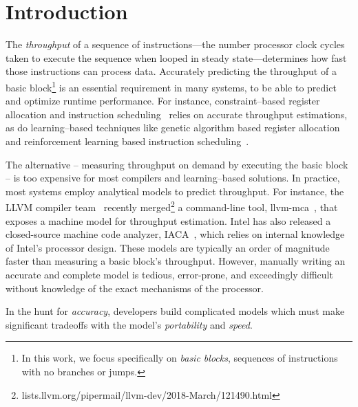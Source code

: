 \section{Introduction}

The {\em throughput} of a sequence of instructions---the number processor clock cycles taken to execute the sequence when looped in steady state---determines how fast those instructions can process data.
Accurately predicting the throughput of a basic block\footnote{In this work, we focus specifically on \emph{basic blocks}, sequences of instructions with no branches or jumps.} is an essential requirement in many systems, to be able to predict and optimize runtime performance.
For instance, constraint--based register allocation and instruction scheduling~\cite{comb-inst-scheduling} relies on accurate throughput estimations, as do learning--based techniques like genetic algorithm based register allocation~\cite{ga-register-allocation} and reinforcement learning based instruction scheduling~\cite{rl-inst-scheduling}.

The alternative -- measuring throughput on demand by executing the basic block -- is too expensive for most compilers and learning--based solutions.
In practice, most systems employ analytical models to predict throughput.
For instance, the LLVM compiler team~\cite{llvm} recently merged\footnote{ lists.llvm.org/pipermail/llvm-dev/2018-March/121490.html} a command-line tool, llvm-mca~\cite{llvm-mca}, that exposes a machine model for throughput estimation.
Intel has also released a closed-source machine code analyzer, IACA~\cite{iaca}, which relies on internal knowledge of Intel's processor design.
These models are typically an order of magnitude faster than measuring a basic block's throughput.
However, manually writing an accurate and complete model is tedious, error-prone, and exceedingly difficult without knowledge of the exact mechanisms of the processor.

In the hunt for {\em accuracy}, developers build complicated models which must make significant tradeoffs with the model's {\em portability} and {\em speed}.


